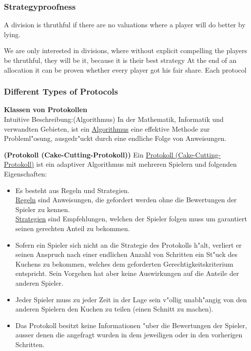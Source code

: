 \subsubsection{Strategyproofness}

\begin{defi}[Thruthfully]
A division is thruthful if there are no valuations where a player will do better
by lying.
\end{defi}
We are only interested in divisions, where without explicit compelling the
players be thruthful, they will be it, because it is their best strategy
At the end of an allocation it can be proven whether every player got his fair share. 
Each protocol 
\newpage
\subsubsection{Different Types of Protocols}
\textbf{Klassen von Protokollen}\\
\newline
Intuitive Beschreibung:(Algorithmus)
\newline In der Mathematik, Informatik und verwandten Gebieten, ist ein
\underline{Algorithmus} eine effektive Methode zur Probleml"osung, ausgedr"uckt
durch eine endliche Folge von Anweisungen.
\begin{defi}{\textbf{(Protokoll (Cake-Cutting-Protokoll))}}
\newline Ein \underline{Protokoll (Cake-Cutting-Protokoll)} ist ein adaptiver
Algorithmus mit mehreren Spielern und folgenden Eigenschaften:
\begin{itemize}
\item{Es besteht aus Regeln und Strategien.\\ \underline{Regeln} sind
Anweisungen, die gefordert werden ohne die Bewertungen der Spieler zu kennen.\\
\underline{Strategien} sind Empfehlungen, welchen der Spieler folgen muss um
garantiert seinen gerechten Anteil zu bekommen.
}
\item{Sofern ein Spieler sich nicht an die Strategie des Protokolls h"alt,
verliert er seinen Anspruch nach einer endlichen Anzahl von Schritten ein St"uck
des Kuchens zu bekommen, welches dem geforderten Gerechtigkeitskriterium
entspricht. Sein Vorgehen hat aber keine Auswirkungen auf die Anteile der
anderen Spieler.}
\item Jeder Spieler muss zu jeder Zeit in der Lage sein v"ollig unabh"angig von
den anderen Spielern den Kuchen zu teilen (einen Schnitt zu machen).
\item Das Protokoll besitzt keine Informationen "uber die Bewertungen der
Spieler, ausser denen die angefragt wurden in dem jeweiligen oder in den
vorherigen Schritten.
\end{itemize}
\end{defi}
